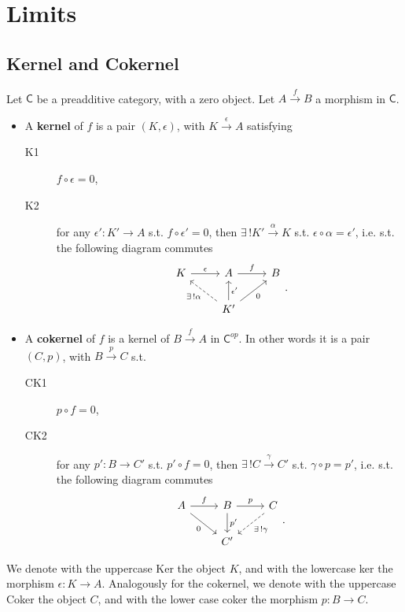 \section{Limits}
\subsection{Kernel and Cokernel}

\begin{defn}[(Co)kernel]
	Let $\mathsf{C}$ be a preadditive category, with a zero object.
	Let $A \xrightarrow{f} B$ a morphism in $\mathsf{C}$.
	\begin{itemize}
		\item A \textbf{kernel} of $f$ is a pair $\left(K, \epsilon\right)$, with $K \xrightarrow{\epsilon} A$ satisfying
	\begin{description}
		\item[K1] $f \circ \epsilon = 0$,
		\item[K2] for any $\epsilon': K' \to A$ s.t. $f \circ \epsilon' = 0$, then
			$\exists\, ! K' \xrightarrow{\alpha} K$ s.t. $\epsilon \circ \alpha = \epsilon'$, i.e. s.t. the following diagram commutes
			\begin{equation}
			\begin{tikzcd}
				K \arrow[r, "\epsilon", rightarrow] & A \arrow[r, "f", rightarrow] & B\\
				    & K' \arrow[lu, "\exists\, ! \alpha", dashrightarrow] \arrow[u, "\epsilon'"', rightarrow] \arrow[ru, "0"', rightarrow] & 
			\end{tikzcd}
			.\end{equation} 
	\end{description} 
	\item A \textbf{cokernel} of $f$ is a kernel of $B \xrightarrow{f} A$ in $\mathsf{C}^{op}$.
		In other words it is a pair $\left(C, p\right)$, with $B \xrightarrow{p} C$ s.t.
	\begin{description}
		\item[CK1] $p \circ f = 0$,
		\item[CK2] for any $p': B \to C'$ s.t. $p' \circ f = 0$, then
			$\exists\, ! C \xrightarrow{\gamma} C'$ s.t. $\gamma \circ p = p'$, i.e. s.t. the following diagram commutes
			\begin{equation}
			\begin{tikzcd}
				A \arrow[r, "f", rightarrow] \arrow[rd, "0"', rightarrow]  & B \arrow[r, "p", rightarrow] \arrow[d, "p'", rightarrow] & C \arrow[ld, "\exists\, ! \gamma", dashrightarrow] \\
				    & C'& 
			\end{tikzcd}
			.\end{equation} 
	\end{description} 
	\end{itemize}
	We denote with the uppercase Ker the object $K$, and with the lowercase ker the morphism $\epsilon: K \to A$.\newline
	Analogously for the cokernel, we denote with the uppercase Coker the object $C$, and with the lower case coker the morphism $p: B \to C$.
\end{defn}

